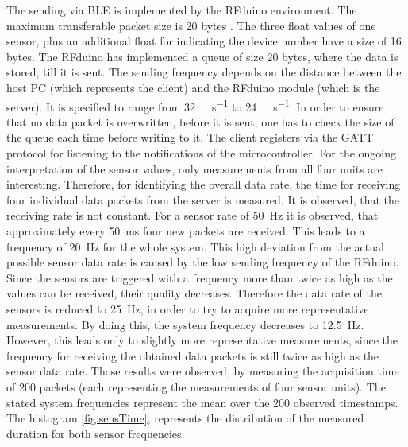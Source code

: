 The sending via BLE is implemented by the RFduino environment. The maximum transferable packet size is 20 bytes \cite{rfduino2015data}. The three float values of one sensor, plus an additional float for indicating the device number have a size of 16 bytes. The RFduino has implemented a queue of size 20 bytes, where the data is stored, till it is sent. The sending frequency depends on the distance between the host PC (which represents the client) and the RFduino module (which is the server). It is specified to range from \SI[per-mode=symbol]{32}{\kilo \bit \per \second} to \SI[per-mode=symbol]{24}{\kilo \bit \per \second}. In order to ensure that no data packet is overwritten, before it is sent, one has to check the size of the queue each time before writing to it. The client registers via the \ac{GATT} protocol for listening to the notifications of the microcontroller. For the ongoing interpretation of the sensor values, only measurements from all four units are interesting. Therefore, for identifying the overall data rate, the time for receiving four individual data packets from the server is measured. It is observed, that the receiving rate is not constant. For a sensor rate of \SI{50}{\Hz} it is observed, that approximately every \SI{50}{\ms} four new packets are received. This leads to a frequency of \SI{20}{\Hz} for the whole system. This high deviation from the actual possible sensor data rate is caused by the low sending frequency of the RFduino. Since the sensors are triggered with a frequency more than twice as high as the values can be received, their quality decreases. Therefore the data rate of the sensors is reduced to \SI{25}{\Hz}, in order to try to acquire more representative measurements. By doing this, the system frequency decreases to \SI{12.5}{\Hz}. However, this leads only to slightly more representative measurements, since the frequency for receiving the obtained data packets is still twice as high as the sensor data rate. Those results were observed, by measuring the acquisition time of 200 packets (each representing the measurements of four sensor units). The stated system frequencies represent the mean over the 200 observed timestamps. The histogram \ref{fig:sensTime}, represents the distribution of the measured duration for both sensor frequencies.
